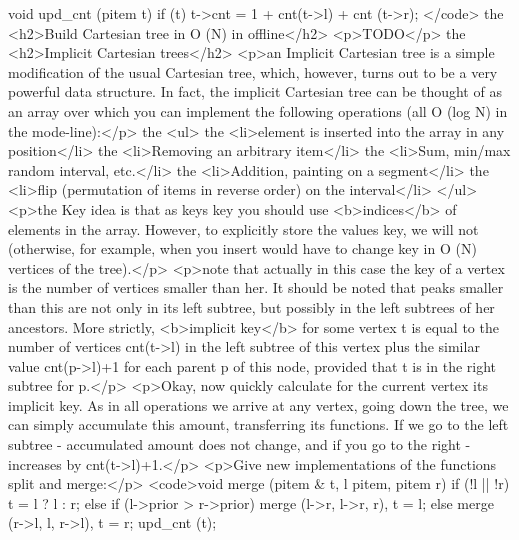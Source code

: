 void upd_cnt (pitem t) {
if (t)
t->cnt = 1 + cnt(t->l) + cnt (t->r);
}</code>
the <h2>Build Cartesian tree in O (N) in offline</h2>
<p>TODO</p>
the <h2>Implicit Cartesian trees</h2>
<p>an Implicit Cartesian tree is a simple modification of the usual Cartesian tree, which, however, turns out to be a very powerful data structure. In fact, the implicit Cartesian tree can be thought of as an array over which you can implement the following operations (all O (log N) in the mode-line):</p>
the <ul>
the <li>element is inserted into the array in any position</li>
the <li>Removing an arbitrary item</li>
the <li>Sum, min/max random interval, etc.</li>
the <li>Addition, painting on a segment</li>
the <li>flip (permutation of items in reverse order) on the interval</li>
</ul>
<p>the Key idea is that as keys key you should use <b>indices</b> of elements in the array. However, to explicitly store the values key, we will not (otherwise, for example, when you insert would have to change key in O (N) vertices of the tree).</p>
<p>note that actually in this case the key of a vertex is the number of vertices smaller than her. It should be noted that peaks smaller than this are not only in its left subtree, but possibly in the left subtrees of her ancestors. More strictly, <b>implicit key</b> for some vertex t is equal to the number of vertices cnt(t->l) in the left subtree of this vertex plus the similar value cnt(p->l)+1 for each parent p of this node, provided that t is in the right subtree for p.</p>
<p>Okay, now quickly calculate for the current vertex its implicit key. As in all operations we arrive at any vertex, going down the tree, we can simply accumulate this amount, transferring its functions. If we go to the left subtree - accumulated amount does not change, and if you go to the right - increases by cnt(t->l)+1.</p>
<p>Give new implementations of the functions split and merge:</p>
<code>void merge (pitem & t, l pitem, pitem r) {
if (!l || !r)
t = l ? l : r;
else if (l->prior > r->prior)
merge (l->r, l->r, r), t = l;
else
merge (r->l, l, r->l), t = r;
upd_cnt (t);
}

